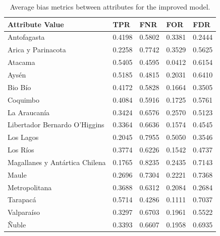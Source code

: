 \documentclass[twoside,11pt]{article}
\begin{document}
\begin{table}[ht]
\centering
\begin{tabular}{|p{3.5cm}|p{1cm}|p{1cm}|p{1cm}|p{1cm}|}
\hline

    \textbf{Attribute Value} &      \textbf{TPR} &      \textbf{FNR} &    \textbf{FOR} &    \textbf{FDR} \\ \hline

                   Antofagasta &   0.4198 &   0.5802 & 0.3381 & 0.2444 \\
            Arica y Parinacota &   0.2258 &   0.7742 & 0.3529 & 0.5625 \\
                       Atacama &   0.5405 &   0.4595 & 0.0412 & 0.6154 \\
                         Aysén &   0.5185 &   0.4815 & 0.2031 & 0.6410 \\
                       Bio Bío &   0.4172 &   0.5828 & 0.1664 & 0.3505 \\
                      Coquimbo &   0.4084 &   0.5916 & 0.1725 & 0.5761 \\
                  La Araucanía &   0.3424 &   0.6576 & 0.2570 & 0.5123 \\
 Libertador Bernardo O'Higgins &   0.3364 &   0.6636 & 0.1574 & 0.4545 \\
                     Los Lagos &   0.2045 &   0.7955 & 0.5050 & 0.3546 \\
                      Los Ríos &   0.3774 &   0.6226 & 0.1542 & 0.4737 \\
Magallanes y Antártica Chilena &   0.1765 &   0.8235 & 0.2435 & 0.7143 \\
                         Maule &   0.2696 &   0.7304 & 0.2221 & 0.7368 \\
                 Metropolitana &   0.3688 &   0.6312 & 0.2084 & 0.2684 \\
                      Tarapacá &   0.5714 &   0.4286 & 0.1111 & 0.7037 \\
                    Valparaíso &   0.3297 &   0.6703 & 0.1961 & 0.5522 \\
                         Ñuble &   0.3393 & 0.6607 & 0.1958 & 0.6935 \\

\hline
\end{tabular}
\caption{Average bias metrics between attributes for the improved model.}
\end{table}
\end{document}
